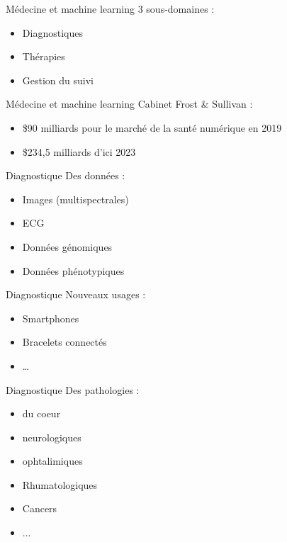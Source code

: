 \begin{frame}{Médecine et machine learning}
  3 sous-domaines :
  \begin{itemize}
  \item Diagnostiques
  \item Thérapies
  \item Gestion du suivi
  \end{itemize}
\end{frame}

\begin{frame}{Médecine et machine learning}
  Cabinet Frost \& Sullivan :
  \begin{itemize}
    \item \$90 milliards pour le marché de la santé numérique en 2019
    \item \$234,5 milliards d’ici 2023
  \end{itemize}
\end{frame}

\begin{frame}{Diagnostique}
  Des données :
  \begin{itemize}
    \item Images (multispectrales)
    \item ECG
    \item Données génomiques 
    \item Données phénotypiques
  \end{itemize}
\end{frame}

\begin{frame}{Diagnostique}
  Nouveaux usages :
  \begin{itemize}
    \item Smartphones
    \item Bracelets connectés
    \item …
  \end{itemize}
\end{frame}


\begin{frame}{Diagnostique}
  Des pathologies :
  \begin{itemize}
    \item du coeur
    \item neurologiques
    \item ophtalimiques
    \item Rhumatologiques
    \item Cancers
    \item ...
  \end{itemize}
\end{frame}

